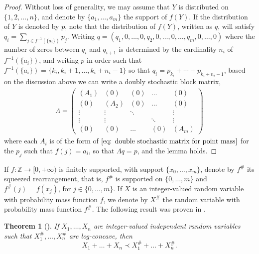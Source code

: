 \documentclass[11pt]{article}
\newtheorem{thm}{Theorem}[section]
\newcommand{\1}{[1]}
\newcommand{\Z}{\mathbb{Z}}
\begin{document}
\begin{proof}
Without loss of generality, we may assume that $Y$ is distributed on $\{1,2,\dots, n\}$, and denote by $\{a_1, \dots, a_m\}$ the support of $f(Y)$. If the distribution of $Y$ is denoted by $p$, note that the distribution of $f(Y)$, written as $q$, will satisfy $q_i = \sum_{j \in f^{-1}(\{a_i\})} p_j$.  Writing $q = (q_1,0, \dots,0,q_2, 0, \dots,0, \dots, q_m, 0,\dots, 0)$ where the number of zeros between $q_i$ and $q_{i+1}$ is determined by the cardinality $n_i$ of $f^{-1}(\{a_i\})$, and writing $p$ in order such that $f^{-1}(\{a_i\}) = \{k_i, k_i+1, \dots, k_i+n_i-1\}$ so that $q_i = p_{k_i} + \cdots + p_{k_i + n_i - 1}$, based on the discussion above we can write a doubly stochastic block matrix,
\begin{align}
    \Lambda = \left( \begin{array}{ccccc}
        (A_1)&(0) &(0) &\dots & (0) \\
        (0) & (A_2) &(0) &\dots & (0) \\
        \vdots & \vdots & \ddots && \vdots \\
        \vdots & \vdots & & \ddots & \vdots \\
        (0) & (0) & \dots & (0) & (A_m)
        \end{array}
        \right)
\end{align}
where each $A_i$ is of the form of $\eqref{eq: double stochastic matrix for point mass}$ for the $p_j$ such that $f(j) = a_i$, so that $\Lambda q  = p$, and the lemma holds.
\end{proof}

If $f \colon \Z \to [0, +\infty)$ is finitely supported, with support $\{x_0, \dots, x_m\}$, denote by $f^\#$ its squeezed rearrangement, that is, $f^\#$ is supported on $\{0, \dots,m\}$ and $f^\#(j) = f(x_j)$, for $j\in\{0, \dots,m\}$. If $X$ is an integer-valued random variable with probability mass function $f$, we denote by $X^\#$ the random variable with probability mass function $f^\#$. The following result was proven in \cite{MWW}.

\begin{thm}[\cite{MWW}]\label{rearrance-2}
If $X_1, \dots, X_n$ are integer-valued independent random variables such that $X_1^\#, \dots, X_n^\#$ are log-concave, then
$$ X_1 + \dots + X_n \prec X_1^\# + \dots + X_n^{\#}. $$    
\end{thm}
\end{document}
